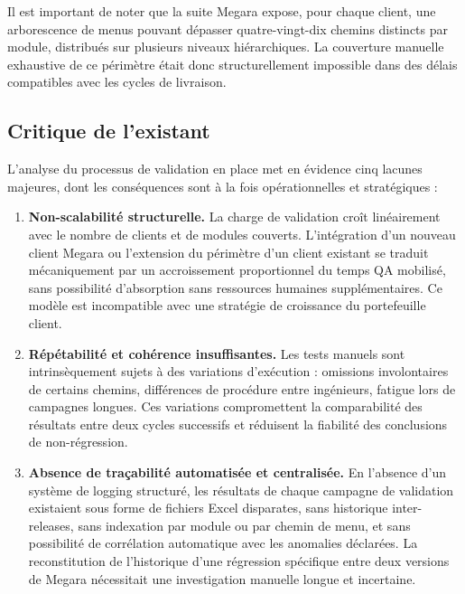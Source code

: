 \documentclass[12pt, a4paper]{report}
\begin{document}
Il est important de noter que la suite Megara expose, pour chaque client, une arborescence de menus pouvant dépasser quatre-vingt-dix chemins distincts par module, distribués sur plusieurs niveaux hiérarchiques. La couverture manuelle exhaustive de ce périmètre était donc structurellement impossible dans des délais compatibles avec les cycles de livraison.

\subsection{Critique de l'existant}

L'analyse du processus de validation en place met en évidence cinq lacunes majeures, dont les conséquences sont à la fois opérationnelles et stratégiques :

\begin{enumerate}[label=\textbf{L\arabic*.}]

  \item \textbf{Non-scalabilité structurelle.}
  La charge de validation croît linéairement avec le nombre de clients et de modules couverts. L'intégration d'un nouveau client Megara ou l'extension du périmètre d'un client existant se traduit mécaniquement par un accroissement proportionnel du temps QA mobilisé, sans possibilité d'absorption sans ressources humaines supplémentaires. Ce modèle est incompatible avec une stratégie de croissance du portefeuille client.

  \item \textbf{Répétabilité et cohérence insuffisantes.}
  Les tests manuels sont intrinsèquement sujets à des variations d'exécution : omissions involontaires de certains chemins, différences de procédure entre ingénieurs, fatigue lors de campagnes longues. Ces variations compromettent la comparabilité des résultats entre deux cycles successifs et réduisent la fiabilité des conclusions de non-régression.

  \item \textbf{Absence de traçabilité automatisée et centralisée.}
  En l'absence d'un système de logging structuré, les résultats de chaque campagne de validation existaient sous forme de fichiers Excel disparates, sans historique inter-releases, sans indexation par module ou par chemin de menu, et sans possibilité de corrélation automatique avec les anomalies déclarées. La reconstitution de l'historique d'une régression spécifique entre deux versions de Megara nécessitait une investigation manuelle longue et incertaine.


\end{enumerate}
\end{document}
